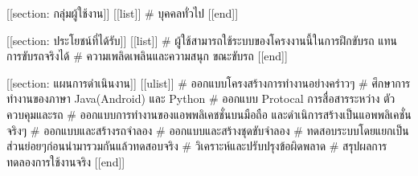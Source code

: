 [[section: กลุ่มผู้ใช้งาน]] 
    [[list]]
        # บุคคลทั่วไป
    [[end]]

[[section: ประโยชน์ที่ได้รับ]] 
    [[list]]
        # ผู้ใช้สามารถใช้ระบบของโครงงานนี้ในการฝึกขับรถ แทนการขับรถจริงได้
        # ความเพลิดเพลินและความสนุก ขณะขับรถ
    [[end]]

[[section: แผนการดำเนินงาน]] 
    [[ulist]]
        # ออกแบบโครงสร้างการทำงานอย่างคร่าวๆ
        # ศึกษาการทำงานของภาษา Java(Android) และ Python
        # ออกแบบ Protocal การสื่อสารระหว่าง ตัวควบคุมและรถ
        # ออกแบบการทำงานของแอพพลิเคชชั่นบนมือถือ และดำเนิการสร้างเป็นแอพพลิเคชั่นจริงๆ
        # ออกแบบและสร้างรถจำลอง
        # ออกแบบและสร้างชุดขับจำลอง
        # ทดสอบระบบโดยแยกเป็นส่วนย่อยๆก่อนนำมารวมกันแล้วทดสอบจริง
        # วิเคราะห์และปรับปรุงข้อผิดพลาด
        # สรุปผลการทดลองการใช้งานจริง
    [[end]]


